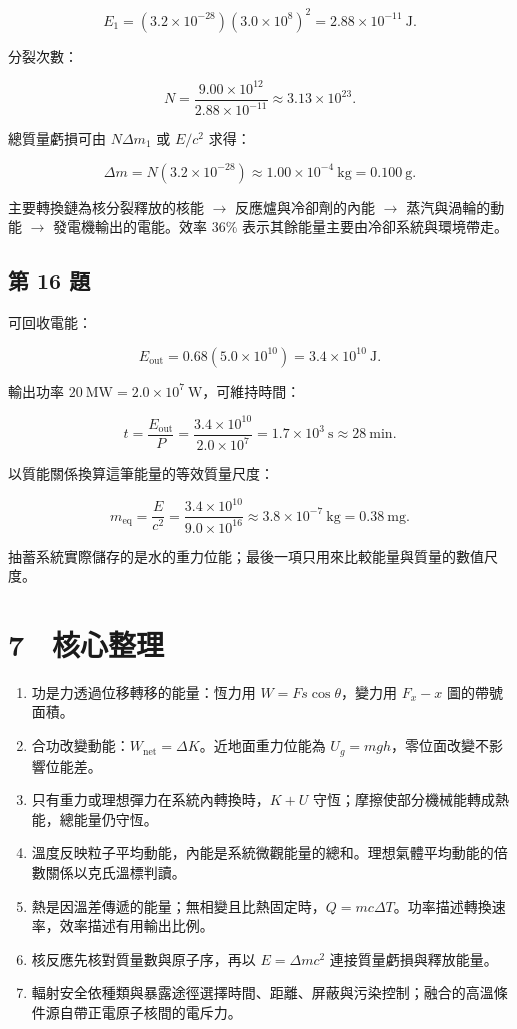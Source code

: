 \documentclass[11pt,a4paper]{article}
\providecommand{\tightlist}{%
  \setlength{\itemsep}{0pt}\setlength{\parskip}{0pt}}
\begin{document}
\[
E_1=(3.2\times10^{-28})(3.0\times10^8)^2
=2.88\times10^{-11}\ \mathrm J.
\]

分裂次數：

\[
N=\frac{9.00\times10^{12}}{2.88\times10^{-11}}
\approx3.13\times10^{23}.
\]

總質量虧損可由 \(N\Delta m_1\) 或 \(E/c^2\) 求得：

\[
\Delta m=N(3.2\times10^{-28})
\approx1.00\times10^{-4}\ \mathrm{kg}=0.100\ \mathrm g.
\]

主要轉換鏈為核分裂釋放的核能 \(\rightarrow\) 反應爐與冷卻劑的內能 \(\rightarrow\) 蒸汽與渦輪的動能 \(\rightarrow\) 發電機輸出的電能。效率 \(36\%\) 表示其餘能量主要由冷卻系統與環境帶走。

\subsection{第 16 題}\label{ux7b2c-16-ux984c}

可回收電能：

\[
E_{\mathrm{out}}=0.68(5.0\times10^{10})
=3.4\times10^{10}\ \mathrm J.
\]

輸出功率 \(20\ \mathrm{MW}=2.0\times10^7\ \mathrm W\)，可維持時間：

\[
t=\frac{E_{\mathrm{out}}}{P}
=\frac{3.4\times10^{10}}{2.0\times10^7}
=1.7\times10^3\ \mathrm s
\approx28\ \mathrm{min}.
\]

以質能關係換算這筆能量的等效質量尺度：

\[
m_{\mathrm{eq}}=\frac{E}{c^2}
=\frac{3.4\times10^{10}}{9.0\times10^{16}}
\approx3.8\times10^{-7}\ \mathrm{kg}
=0.38\ \mathrm{mg}.
\]

抽蓄系統實際儲存的是水的重力位能；最後一項只用來比較能量與質量的數值尺度。

\section{7　核心整理}\label{ux6838ux5fc3ux6574ux7406}

\begin{enumerate}
\def\labelenumi{\arabic{enumi}.}
\tightlist
\item
  功是力透過位移轉移的能量：恆力用 \(W=Fs\cos\theta\)，變力用 \(F_x-x\) 圖的帶號面積。
\item
  合功改變動能：\(W_{\mathrm{net}}=\Delta K\)。近地面重力位能為 \(U_g=mgh\)，零位面改變不影響位能差。
\item
  只有重力或理想彈力在系統內轉換時，\(K+U\) 守恆；摩擦使部分機械能轉成熱能，總能量仍守恆。
\item
  溫度反映粒子平均動能，內能是系統微觀能量的總和。理想氣體平均動能的倍數關係以克氏溫標判讀。
\item
  熱是因溫差傳遞的能量；無相變且比熱固定時，\(Q=mc\Delta T\)。功率描述轉換速率，效率描述有用輸出比例。
\item
  核反應先核對質量數與原子序，再以 \(E=\Delta mc^2\) 連接質量虧損與釋放能量。
\item
  輻射安全依種類與暴露途徑選擇時間、距離、屏蔽與污染控制；融合的高溫條件源自帶正電原子核間的電斥力。
\end{enumerate}
\end{document}
